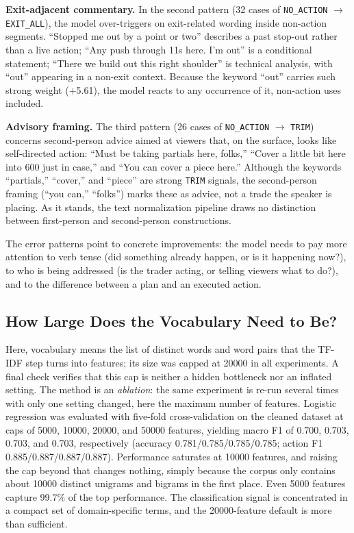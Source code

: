 \textbf{Exit-adjacent commentary.} In the second pattern (32 cases of \texttt{NO\_ACTION} $\rightarrow$ \texttt{EXIT\_ALL}), the model over-triggers on exit-related wording inside non-action segments. ``Stopped me out by a point or two'' describes a past stop-out rather than a live action; ``Any push through 11s here. I'm out'' is a conditional statement; ``There we build out this right shoulder'' is technical analysis, with ``out'' appearing in a non-exit context. Because the keyword ``out'' carries such strong weight (+5.61), the model reacts to any occurrence of it, non-action uses included.

\textbf{Advisory framing.} The third pattern (26 cases of \texttt{NO\_ACTION} $\rightarrow$ \texttt{TRIM}) concerns second-person advice aimed at viewers that, on the surface, looks like self-directed action: ``Must be taking partials here, folks,'' ``Cover a little bit here into 600 just in case,'' and ``You can cover a piece here.'' Although the keywords ``partials,'' ``cover,'' and ``piece'' are strong \texttt{TRIM} signals, the second-person framing (``you can,'' ``folks'') marks these as advice, not a trade the speaker is placing. As it stands, the text normalization pipeline draws no distinction between first-person and second-person constructions.

The error patterns point to concrete improvements: the model needs to pay more attention to verb tense (did something already happen, or is it happening now?), to who is being addressed (is the trader acting, or telling viewers what to do?), and to the difference between a plan and an executed action.

\subsection{How Large Does the Vocabulary Need to Be?}
\label{sec:vocab_ablation}

Here, vocabulary means the list of distinct words and word pairs that the TF-IDF step turns into features; its size was capped at 20000 in all experiments. A final check verifies that this cap is neither a hidden bottleneck nor an inflated setting. The method is an \emph{ablation}: the same experiment is re-run several times with only one setting changed, here the maximum number of features. Logistic regression was evaluated with five-fold cross-validation on the cleaned dataset at caps of 5000, 10000, 20000, and 50000 features, yielding macro F1 of 0.700, 0.703, 0.703, and 0.703, respectively (accuracy 0.781/0.785/0.785/0.785; action F1 0.885/0.887/0.887/0.887). Performance saturates at 10000 features, and raising the cap beyond that changes nothing, simply because the corpus only contains about 10000 distinct unigrams and bigrams in the first place. Even 5000 features capture 99.7\% of the top performance. The classification signal is concentrated in a compact set of domain-specific terms, and the 20000-feature default is more than sufficient.

